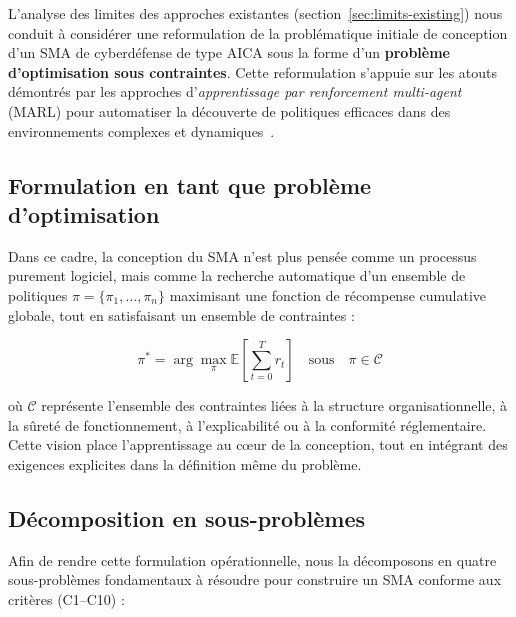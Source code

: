 \documentclass[ twoside,openright,titlepage,numbers=noenddot,headinclude,%
                footinclude=true,cleardoublepage=empty,abstractoff, %
                BCOR=5mm,paper=a4,fontsize=11pt,%
                french,american,%
                ]{scrreprt}
\begin{document}
L'analyse des limites des approches existantes (section~\ref{sec:limits-existing}) nous conduit à considérer une reformulation de la problématique initiale de conception d'un SMA de cyberdéfense de type AICA sous la forme d'un \textbf{problème d'optimisation sous contraintes}. Cette reformulation s'appuie sur les atouts démontrés par les approches d'\textit{apprentissage par renforcement multi-agent} (MARL) pour automatiser la découverte de politiques efficaces dans des environnements complexes et dynamiques~\cite{Zhang2021survey, Papoudakis2021}.

\subsection{Formulation en tant que problème d'optimisation}

Dans ce cadre, la conception du SMA n'est plus pensée comme un processus purement logiciel, mais comme la recherche automatique d'un ensemble de politiques \(\pi = \{\pi_1, \dots, \pi_n\}\) maximisant une fonction de récompense cumulative globale, tout en satisfaisant un ensemble de contraintes :

\begin{equation}
\pi^* = \arg\max_{\pi} \mathbb{E}\left[\sum_{t=0}^{T} r_t\right] \quad \text{sous} \quad \pi \in \mathcal{C}
\end{equation}

où \(\mathcal{C}\) représente l'ensemble des contraintes liées à la structure organisationnelle, à la sûreté de fonctionnement, à l'explicabilité ou à la conformité réglementaire. Cette vision place l'apprentissage au cœur de la conception, tout en intégrant des exigences explicites dans la définition même du problème.

\subsection{Décomposition en sous-problèmes}

Afin de rendre cette formulation opérationnelle, nous la décomposons en quatre sous-problèmes fondamentaux à résoudre pour construire un SMA conforme aux critères (C1–C10) :
\end{document}
